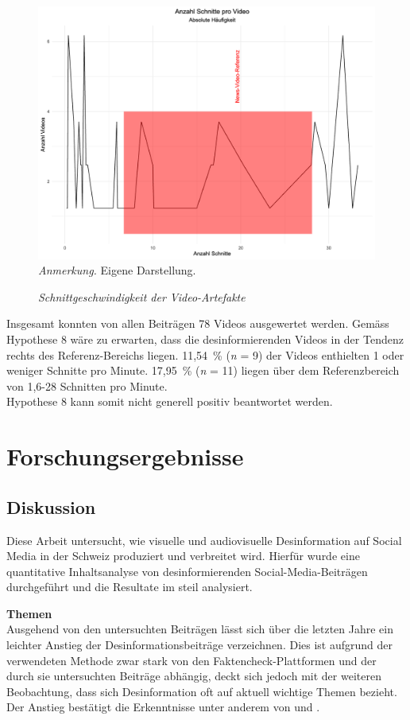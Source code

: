 \documentclass[12pt,a4paper]{article}        %
\begin{document}
\begin{figure}[H]
  \caption{\textit{Schnittgeschwindigkeit der Video-Artefakte}}
  \label{fig:video_cut_plot}
  \centering
  \includegraphics[width=1\linewidth]{images/video_cpm_plot.png}
  \footnotesize\textit{Anmerkung.} Eigene Darstellung.
\end{figure}
Insgesamt konnten von allen Beiträgen 78 Videos ausgewertet werden. Gemäss Hypothese 8 wäre zu erwarten, dass die desinformierenden Videos in der Tendenz rechts des Referenz-Bereichs liegen. 11,54 \% (\textit{n} = 9) der Videos enthielten 1 oder weniger Schnitte pro Minute. 17,95 \% (\textit{n} = 11) liegen über dem Referenzbereich von 1,6-28 Schnitten pro Minute.\\
Hypothese 8 kann somit nicht generell positiv beantwortet werden.

\pagebreak
\section{Forschungsergebnisse}
\subsection{Diskussion}
Diese Arbeit untersucht, wie visuelle und audiovisuelle Desinformation auf Social Media in der Schweiz produziert und verbreitet wird. Hierfür wurde eine quantitative Inhaltsanalyse von desinformierenden Social-Media-Beiträgen durchgeführt und die Resultate im steil analysiert.

\textbf{Themen}\\
Ausgehend von den untersuchten Beiträgen lässt sich über die letzten Jahre ein leichter Anstieg der Desinformationsbeiträge verzeichnen. Dies ist aufgrund der verwendeten Methode zwar stark von den Faktencheck-Plattformen und der durch sie untersuchten Beiträge abhängig, deckt sich jedoch mit der weiteren Beobachtung, dass sich Desinformation oft auf aktuell wichtige Themen bezieht. Der Anstieg bestätigt die Erkenntnisse unter anderem von \textcite{khan_fake_2021} und \textcite[26]{vogler_wahrnehmung_2021}. 
\end{document}
